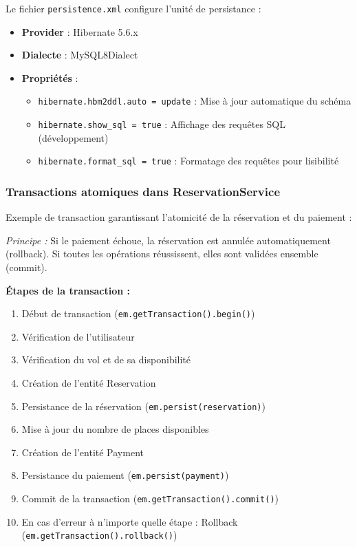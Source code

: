 \documentclass[12pt,a4paper]{report}
\begin{document}
Le fichier \texttt{persistence.xml} configure l'unité de persistance :

\begin{itemize}
    \item \textbf{Provider} : Hibernate 5.6.x
    \item \textbf{Dialecte} : MySQL8Dialect
    \item \textbf{Propriétés} :
    \begin{itemize}
        \item \texttt{hibernate.hbm2ddl.auto = update} : Mise à jour automatique du schéma
        \item \texttt{hibernate.show\_sql = true} : Affichage des requêtes SQL (développement)
        \item \texttt{hibernate.format\_sql = true} : Formatage des requêtes pour lisibilité
    \end{itemize}
\end{itemize}

\subsubsection{Transactions atomiques dans ReservationService}

Exemple de transaction garantissant l'atomicité de la réservation et du paiement :

\textit{Principe :} Si le paiement échoue, la réservation est annulée automatiquement (rollback). Si toutes les opérations réussissent, elles sont validées ensemble (commit).

\textbf{Étapes de la transaction :}

\begin{enumerate}
    \item Début de transaction (\texttt{em.getTransaction().begin()})
    \item Vérification de l'utilisateur
    \item Vérification du vol et de sa disponibilité
    \item Création de l'entité Reservation
    \item Persistance de la réservation (\texttt{em.persist(reservation)})
    \item Mise à jour du nombre de places disponibles
    \item Création de l'entité Payment
    \item Persistance du paiement (\texttt{em.persist(payment)})
    \item Commit de la transaction (\texttt{em.getTransaction().commit()})
    \item En cas d'erreur à n'importe quelle étape : Rollback (\texttt{em.getTransaction().rollback()})
\end{enumerate}
\end{document}
